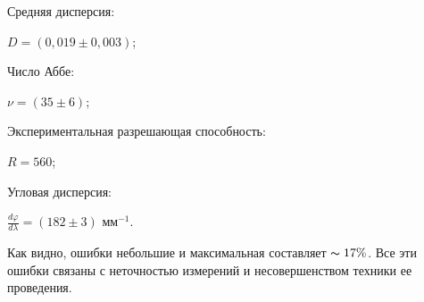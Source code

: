 \documentclass[a4paper,12pt]{article} %
\begin{document}
\noindent	Средняя дисперсия:
	
\noindent	$D = (0,019 \pm 0,003)$;

\noindent	Число Аббе:
	
\noindent	$\nu = (35 \pm 6)$;

\noindent	Экспериментальная разрешающая способность:
	
\noindent	$R = 560$;
	
\noindent	Угловая дисперсия:
	
\noindent	$\frac{d \varphi}{d \lambda} = (182 \pm 3) \text{ мм}^{-1}$.

\vspace{5mm}

	Как видно, ошибки небольшие и максимальная составляет $\thicksim 17\%$. Все эти ошибки связаны с неточностью измерений и несовершенством техники ее проведения.
\end{document}

